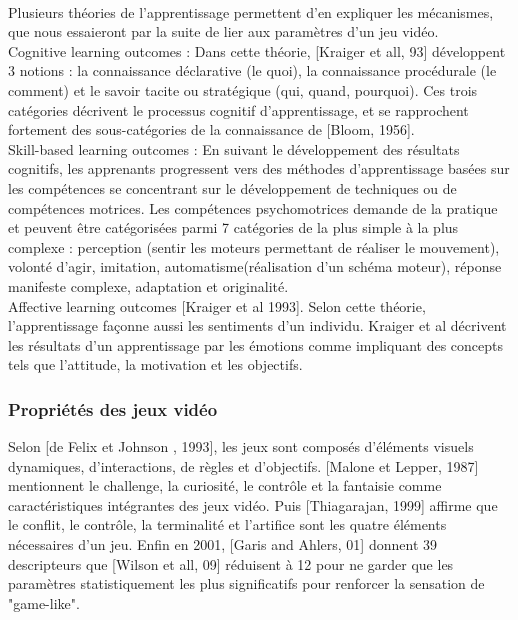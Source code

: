 \paragraph{}Plusieurs théories de l'apprentissage permettent d'en expliquer les mécanismes, que nous essaieront par la suite de lier aux paramètres d'un jeu vidéo.\\

Cognitive learning outcomes :  Dans cette théorie, [Kraiger et all, 93] développent 3 notions : la connaissance déclarative (le quoi), la connaissance procédurale (le comment) et le savoir tacite ou stratégique (qui, quand, pourquoi). Ces trois catégories décrivent le processus cognitif d'apprentissage, et se rapprochent fortement des sous-catégories de la connaissance de [Bloom, 1956].\\ 

Skill-based learning outcomes : En suivant le développement des résultats cognitifs, les apprenants progressent vers des méthodes d'apprentissage basées sur les compétences se concentrant sur le développement de techniques ou de compétences motrices. Les compétences psychomotrices demande de la pratique et peuvent être catégorisées parmi 7 catégories de la plus simple à la plus complexe : perception (sentir les moteurs permettant de réaliser le mouvement), volonté d'agir, imitation, automatisme(réalisation d'un schéma moteur), réponse manifeste complexe, adaptation et originalité.\\ 

Affective learning outcomes [Kraiger et al 1993]. Selon cette théorie, l'apprentissage façonne aussi les sentiments d'un individu. Kraiger et al décrivent les résultats d'un apprentissage par les émotions comme impliquant des concepts tels que l'attitude, la motivation et les objectifs.

			\subsubsection*{Propriétés des jeux vidéo}
Selon [de Felix et Johnson , 1993], les jeux sont composés d'éléments visuels dynamiques, d'interactions, de règles et d'objectifs. [Malone et Lepper, 1987] mentionnent le challenge, la curiosité, le contrôle et la fantaisie comme caractéristiques intégrantes des jeux vidéo. Puis [Thiagarajan, 1999] affirme que le conflit, le contrôle, la terminalité et l'artifice sont les quatre éléments nécessaires d'un jeu. Enfin en 2001, [Garis and Ahlers, 01] donnent 39 descripteurs que [Wilson et all, 09] réduisent à 12 pour ne garder que les paramètres statistiquement les plus significatifs pour renforcer la sensation de "game-like".

